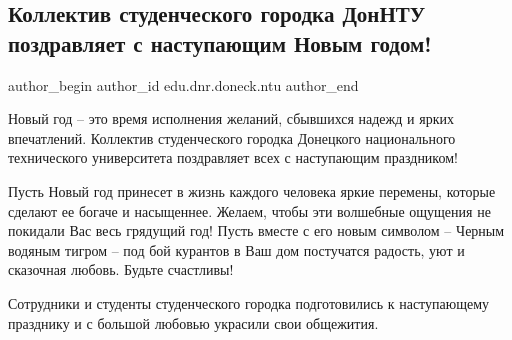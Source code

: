  
 
 
 
 

\subsection{Коллектив студенческого городка ДонНТУ поздравляет с наступающим Новым годом!}
\label{sec:29_12_2021.stz.edu.dnr.doneck.ntu.1.s_novym_godom_stud_gorodok}

\ifcmt
 author_begin
   author_id edu.dnr.doneck.ntu
 author_end
\fi


Новый год – это время исполнения желаний, сбывшихся надежд и ярких впечатлений.
Коллектив студенческого городка Донецкого национального технического
университета поздравляет всех с наступающим праздником!


Пусть Новый год принесет в жизнь каждого человека яркие перемены, которые
сделают ее богаче и насыщеннее.  Желаем, чтобы эти волшебные ощущения не
покидали Вас весь грядущий год! Пусть вместе с его новым символом – Черным
водяным тигром – под бой курантов в Ваш дом постучатся радость, уют и сказочная
любовь. Будьте счастливы!

Сотрудники и студенты студенческого городка подготовились к наступающему
празднику и с большой любовью украсили свои общежития. 

